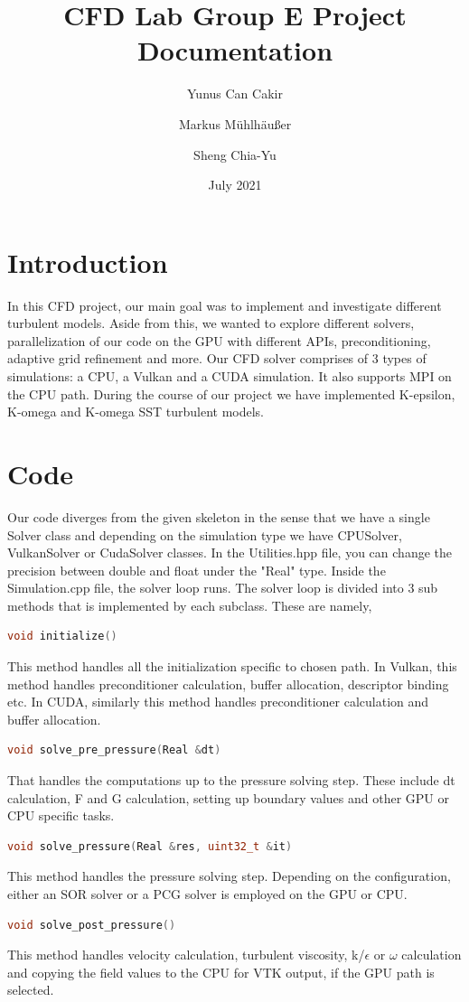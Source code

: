 \documentclass{article}
\title{CFD Lab Group E Project Documentation}
\date{July 2021}
\author{
  Yunus Can Cakir\\
  \text{Technical University of Munich}
  \and
  Markus Mühlhäußer\\
  \text{Technical University of Munich}
  \and
   Sheng Chia-Yu\\
  \text{Technical University of Munich}
}
\begin{document}
\maketitle

\section{Introduction}
In this CFD project, our main goal was to implement and investigate different turbulent models. Aside from this, we wanted to explore different solvers, parallelization of our code on the GPU with different APIs, preconditioning, adaptive grid refinement and more. Our CFD solver comprises of 3 types of simulations: a CPU, a Vulkan and a CUDA simulation. It also supports MPI on the CPU path. During the course of our project we have implemented K-epsilon, K-omega and K-omega SST turbulent models.

\section{Code}
Our code diverges from the given skeleton in the sense that we have a single Solver class and depending on the simulation type we have CPUSolver, VulkanSolver or CudaSolver classes. In the Utilities.hpp file, you can change the precision between double and float under the "Real" type. Inside the Simulation.cpp file, the solver loop runs. The solver loop is divided into 3 sub methods that is implemented by each subclass. These are namely, 
\begin{lstlisting}[language=C++,frame=single]
void initialize()
\end{lstlisting}
This method handles all the initialization specific to chosen path. In Vulkan, this method handles preconditioner calculation, buffer allocation, descriptor binding etc. In CUDA, similarly this method handles preconditioner calculation and buffer allocation.
\begin{lstlisting}[language=C++,frame=single]
void solve_pre_pressure(Real &dt)
\end{lstlisting}
That handles the computations up to the pressure solving step. These include dt calculation, F and G calculation, setting up boundary values and other GPU or CPU specific tasks.
\begin{lstlisting}[language=C++,frame=single]
void solve_pressure(Real &res, uint32_t &it)
\end{lstlisting}
This method handles the pressure solving step. Depending on the configuration, either an SOR solver or a PCG solver is employed on the GPU or CPU.
\begin{lstlisting}[language=C++,frame=single]
void solve_post_pressure()
\end{lstlisting}
This method handles velocity calculation, turbulent viscosity, k/$\epsilon$ or $\omega$ calculation and copying the field values to the CPU for VTK output, if the GPU path is selected.
\end{document}
